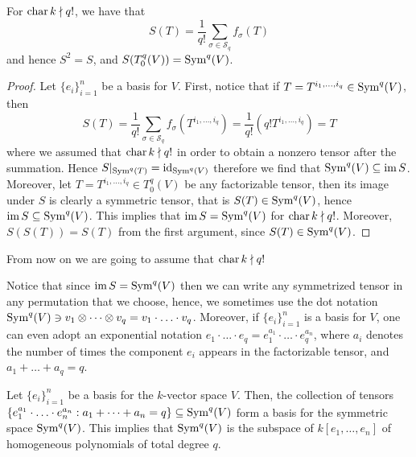 \begin{proposition}
  For \(\operatorname{char} k \nmid q!\), we have that
  \[
    S(T) = \frac{1}{q!} \sum_{\sigma \in \mathcal S_q} f_\sigma(T)
  \]
  and hence \(S^2 = S\), and \(S(T_0^q(V)) = \operatorname{Sym}^q(V)\).
\end{proposition}

\begin{proof}
  Let \(\{e_i\}_{i=1}^n\) be a basis for \(V\). First, notice that if \(T =
  T^{i_1, \dots, i_q} \in \operatorname{Sym}^q(V)\),
  then
  \[
    S(T) = \frac{1}{q!} \sum_{\sigma \in \mathcal S_q} f_\sigma(T^{i_1, \dots,
    i_q}) = \frac{1}{q!} (q! T^{i_1, \dots, i_q}) = T
  \]
  where we assumed that \(\operatorname{char} k \nmid q!\) in order to obtain a nonzero tensor
  after the summation. Hence \(S|_{\operatorname{Sym}^q(T)} = \operatorname{id}_{\operatorname{Sym}^q(V)}\) therefore we
  find that \(\operatorname{Sym}^q(V) \subseteq \operatorname{im} S\). Moreover, let \(T = T^{i_1, \dots,
  i_q} \in T_0^q(V)\) be any factorizable tensor, then its image under \(S\) is
  clearly a symmetric tensor, that is \(S(T) \in \operatorname{Sym}^q(V)\), hence \(\operatorname{im} S
  \subseteq \operatorname{Sym}^q(V)\). This implies that \(\operatorname{im} S = \operatorname{Sym}^q(V)\) for \(\operatorname{char} k
  \nmid q!\). Moreover, \(S(S(T)) = S(T)\) from the first argument, since
  \(S(T) \in \operatorname{Sym}^q(V)\).
\end{proof}

\begin{remark}
  From now on we are going to assume that \(\operatorname{char} k \nmid q!\)
\end{remark}

\begin{notation}
  Notice that since \(\operatorname{im} S = \operatorname{Sym}^q(V)\) then we can write any symmetrized
  tensor in any permutation that we choose, hence, we sometimes use the dot
  notation \(\operatorname{Sym}^q(V) \ni v_1 \otimes \dots \otimes v_q = v_1 \cdot \ldots
  \cdot v_q\). Moreover, if \(\{e_i\}_{i=1}^n\) is a basis for \(V\), one can
  even adopt an exponential notation \(e_1 \cdot \ldots \cdot e_q = e_1^{a_1}
  \cdot \ldots \cdot e_q^{a_n}\), where \(a_i\) denotes the number of times the
  component \(e_i\) appears in the factorizable tensor, and \(a_1 + \dots + a_q
  = q\).
\end{notation}

\begin{proposition}
  \label{prop: basis for symmetric power}
  Let \(\{e_i\}_{i=1}^n\) be a basis for the \(k\)-vector space \(V\). Then, the
  collection of tensors \(\{e_1^{a_1} \cdot \ldots \cdot e_n^{a_n} : a_1 + \dots
  + a_n = q\} \subseteq \operatorname{Sym}^q(V)\) form a basis for the symmetric space
  \(\operatorname{Sym}^q(V)\). This implies that \(\operatorname{Sym}^q(V)\) is the subspace of \(k[e_1,
  \dots, e_n]\) of homogeneous polynomials of total degree \(q\).
\end{proposition}

